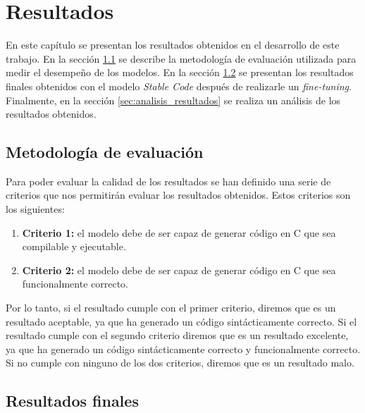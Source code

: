 \chapter{Resultados}
\label{cap:resultados}


En este capítulo se presentan los resultados obtenidos en el desarrollo de este trabajo. 
En la sección \ref{sec:evaluacion} se describe la metodología de evaluación utilizada 
para medir el desempeño de los modelos. En la sección \ref{sec:resultados_finales} se
presentan los resultados finales obtenidos con el modelo \textit{Stable Code} después 
de realizarle un \textit{fine-tuning}. Finalmente, en la sección \ref{sec:analisis_resultados}
se realiza un análisis de los resultados obtenidos.

\section{Metodología de evaluación}
\label{sec:evaluacion}


Para poder evaluar la calidad de los resultados se han definido una serie de criterios que
nos permitirán evaluar los resultados obtenidos. Estos criterios son los siguientes:

\begin{enumerate}
    \item \textbf{Criterio 1:} el modelo debe de ser capaz de generar código en C que sea
        compilable y ejecutable.
    \item \textbf{Criterio 2:} el modelo debe de ser capaz de generar código en C que sea
        funcionalmente correcto.
\end{enumerate}

Por lo tanto, si el resultado cumple con el primer criterio, diremos que es un resultado aceptable,
ya que ha generado un código sintácticamente correcto. Si el resultado cumple con el segundo criterio
diremos que es un resultado excelente, ya que ha generado un código sintácticamente correcto y funcionalmente
correcto. Si no cumple con ninguno de los dos criterios, diremos que es un resultado malo.

\section{Resultados finales}
\label{sec:resultados_finales}

